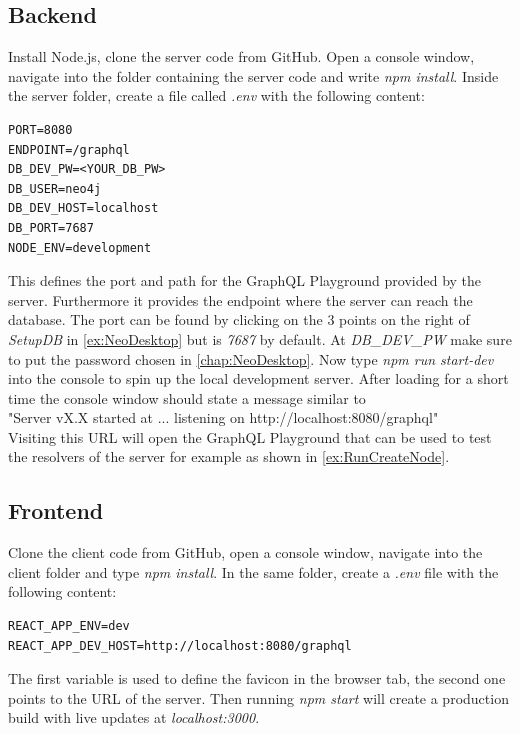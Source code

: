 \subsection{Backend}
Install Node.js, clone the server \cite{GitServer} code from GitHub. Open a console window, navigate into the folder containing the server code and write \emph{npm install}. Inside the server folder, create a file called \emph{.env} with the following content:
\lstset{language=Docker}
\begin{lstlisting}[caption={Environment Variables for the Server}]
PORT=8080
ENDPOINT=/graphql
DB_DEV_PW=<YOUR_DB_PW>
DB_USER=neo4j
DB_DEV_HOST=localhost
DB_PORT=7687
NODE_ENV=development
\end{lstlisting}
This defines the port and path for the GraphQL Playground provided by the server. Furthermore it provides the endpoint where the server can reach the database. The port can be found by clicking on the 3 points on the right of \emph{SetupDB} in \autoref{ex:NeoDesktop} but is \emph{7687} by default. At \emph{DB\_DEV\_PW} make sure to put the password chosen in \autoref{chap:NeoDesktop}.
Now type \emph{npm run start-dev} into the console to spin up the local development server. After loading for a short time the console window should state a message similar to \\
"Server vX.X started at ... listening on http://localhost:8080/graphql" \\
Visiting this URL will open the GraphQL Playground that can be used to test the resolvers of the server for example as shown in \autoref{ex:RunCreateNode}.

\subsection{Frontend}
Clone the client \cite{GitClient} code from GitHub, open a console window, navigate into the client folder and type \emph{npm install}. In the same folder, create a \emph{.env} file with the following content:
\begin{lstlisting}[caption={Environment Variables for the Frontend}]
REACT_APP_ENV=dev
REACT_APP_DEV_HOST=http://localhost:8080/graphql
\end{lstlisting}
The first variable is used to define the favicon in the browser tab, the second one points to the URL of the server. Then running \emph{npm start} will create a production build with live updates at \emph{localhost:3000}.

